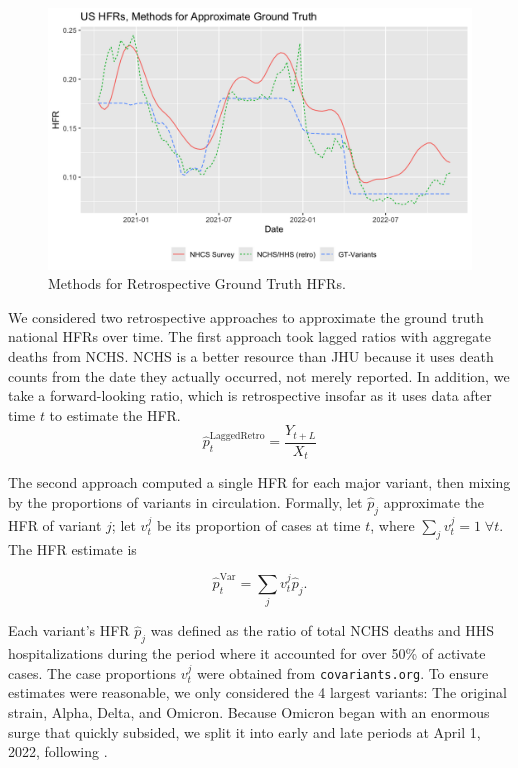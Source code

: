 \documentclass{article}
\begin{document}
\begin{figure}
    \centering
    \includegraphics[width=0.8\linewidth]{Figs/ApproxGT.png}
    \caption{Methods for Retrospective Ground Truth HFRs.}
    \label{fig:approxGT}
\end{figure}

We considered two retrospective approaches to approximate the ground truth national HFRs over time. The first approach took lagged ratios with aggregate deaths from NCHS. NCHS is a better resource than JHU because it uses death counts from the date they actually occurred, not merely reported. In addition, we take a forward-looking ratio, which is retrospective insofar as it uses data after time $t$ to estimate the HFR.
$$\hat{p}_t^{\text{LaggedRetro}} = \frac{Y_{t+L}}{X_t}$$ %
    

The second approach computed a single HFR for each major variant, then mixing by the proportions of variants in circulation. Formally, let $\hat{p}_j$ approximate the HFR of variant $j$; let $v_t^j$ be its proportion of cases at time $t$, where $\sum_j v_t^j = 1 \; \forall t$. The HFR estimate is

$$\hat{p}_t^{\text{Var}} = \sum_j v_t^j \hat{p}_j.$$

Each variant's HFR $\hat p_j$ was defined as the ratio of total NCHS deaths and HHS hospitalizations during the period where it accounted for over 50\% of activate cases. The case proportions $v_t^j$ were obtained from \texttt{covariants.org}. To ensure estimates were reasonable, we only considered the 4 largest variants: The original strain, Alpha, Delta, and Omicron. Because Omicron began with an enormous surge that quickly subsided, we split it into early and late periods at April 1, 2022, following \cite{adjei2022mortality}.
\end{document}
